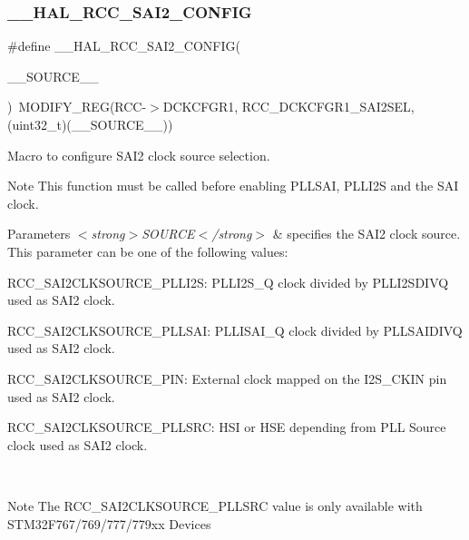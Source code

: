 \subsubsection{\texorpdfstring{\_\_HAL\_RCC\_SAI2\_CONFIG}{\_\_HAL\_RCC\_SAI2\_CONFIG}}
{\footnotesize\ttfamily \#define \+\_\+\+\_\+\+H\+A\+L\+\_\+\+R\+C\+C\+\_\+\+S\+A\+I2\+\_\+\+C\+O\+N\+F\+IG(\begin{DoxyParamCaption}\item[{}]{\+\_\+\+\_\+\+S\+O\+U\+R\+C\+E\+\_\+\+\_\+ }\end{DoxyParamCaption})~M\+O\+D\+I\+F\+Y\+\_\+\+R\+EG(R\+CC-\/$>$D\+C\+K\+C\+F\+G\+R1, R\+C\+C\+\_\+\+D\+C\+K\+C\+F\+G\+R1\+\_\+\+S\+A\+I2\+S\+EL, (uint32\+\_\+t)(\+\_\+\+\_\+\+S\+O\+U\+R\+C\+E\+\_\+\+\_\+))}



Macro to configure S\+A\+I2 clock source selection. 

\begin{DoxyNote}{Note}
This function must be called before enabling P\+L\+L\+S\+AI, P\+L\+L\+I2S and the S\+AI clock. 
\end{DoxyNote}

\begin{DoxyParams}{Parameters}
{\em $<$strong$>$\+S\+O\+U\+R\+C\+E$<$/strong$>$} & specifies the S\+A\+I2 clock source. This parameter can be one of the following values\+: \begin{DoxyItemize}
\item R\+C\+C\+\_\+\+S\+A\+I2\+C\+L\+K\+S\+O\+U\+R\+C\+E\+\_\+\+P\+L\+L\+I2S\+: P\+L\+L\+I2\+S\+\_\+Q clock divided by P\+L\+L\+I2\+S\+D\+I\+VQ used as S\+A\+I2 clock. \item R\+C\+C\+\_\+\+S\+A\+I2\+C\+L\+K\+S\+O\+U\+R\+C\+E\+\_\+\+P\+L\+L\+S\+AI\+: P\+L\+L\+I\+S\+A\+I\+\_\+Q clock divided by P\+L\+L\+S\+A\+I\+D\+I\+VQ used as S\+A\+I2 clock. \item R\+C\+C\+\_\+\+S\+A\+I2\+C\+L\+K\+S\+O\+U\+R\+C\+E\+\_\+\+P\+IN\+: External clock mapped on the I2\+S\+\_\+\+C\+K\+IN pin used as S\+A\+I2 clock. \item R\+C\+C\+\_\+\+S\+A\+I2\+C\+L\+K\+S\+O\+U\+R\+C\+E\+\_\+\+P\+L\+L\+S\+RC\+: H\+SI or H\+SE depending from P\+LL Source clock used as S\+A\+I2 clock. \end{DoxyItemize}
\\
\hline
\end{DoxyParams}
\begin{DoxyNote}{Note}
The R\+C\+C\+\_\+\+S\+A\+I2\+C\+L\+K\+S\+O\+U\+R\+C\+E\+\_\+\+P\+L\+L\+S\+RC value is only available with S\+T\+M32\+F767/769/777/779xx Devices 
\end{DoxyNote}
\mbox{\label{group___r_c_c_ex___exported___macros_gab0f67736ba0c44c47e38b83ceedd3c17}} 
